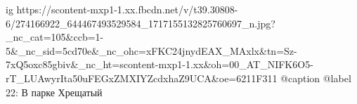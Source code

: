  
 
 
 
 

\ifcmt
  ig https://scontent-mxp1-1.xx.fbcdn.net/v/t39.30808-6/274166922_644467493529584_1717155132825760697_n.jpg?_nc_cat=105&ccb=1-5&_nc_sid=5cd70e&_nc_ohc=xFKC24jnydEAX_MAxlx&tn=Sz-7xQ5oxc85gbiv&_nc_ht=scontent-mxp1-1.xx&oh=00_AT_NIFK6O5-rT_LUAwyrIta50uFEGxZMXIYZcdxhaZ9UCA&oe=6211F311
  @caption @label 22: В парке Хрещатый
\fi
